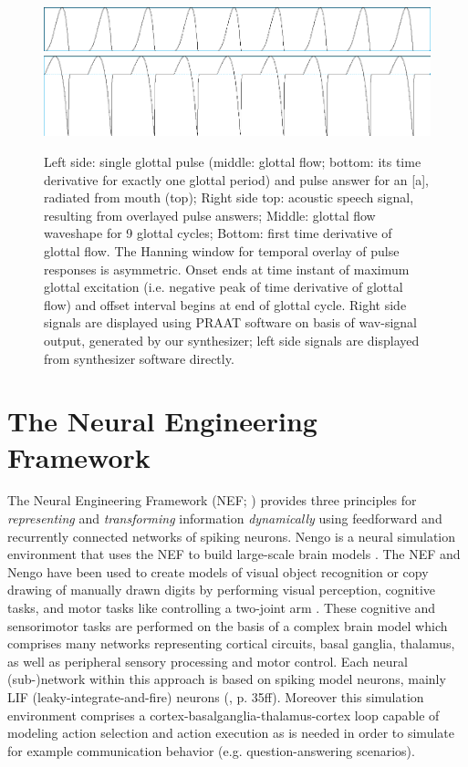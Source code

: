 \documentclass[conference]{IEEEtran}
\begin{document}
\begin{figure}[!t]
\begin{minipage}[b]{0.8\columnwidth}
    \includegraphics[width=\textwidth]{signal3}\\
    \includegraphics[width=\textwidth]{signal4}
  \end{minipage}
  \caption{Left side: single glottal pulse (middle: glottal flow;
    bottom: its time derivative for exactly one glottal period) and
    pulse answer for an [a], radiated from mouth (top); Right side
    top: acoustic speech signal, resulting from overlayed pulse
    answers; Middle: glottal flow waveshape for 9 glottal cycles;
    Bottom: first time derivative of glottal flow. The Hanning window
    for temporal overlay of pulse responses is asymmetric. Onset ends
    at time instant of maximum glottal excitation (i.e. negative peak
    of time derivative of glottal flow) and offset interval begins at
    end of glottal cycle. Right side signals are displayed using PRAAT
    software on basis of wav-signal output, generated by our
    synthesizer; left side signals are displayed from synthesizer
    software directly.}
\label{fig:signal}
\end{figure}

\section{The Neural Engineering Framework}

The Neural Engineering Framework (NEF; \cite{eliasmith2003})
provides three principles for \textit{representing} and
\textit{transforming} information \textit{dynamically}
using feedforward and recurrently connected networks
of spiking neurons.
Nengo is a neural simulation environment that uses the NEF
to build large-scale brain models \cite{bekolay2014}.
The NEF and Nengo have been used to create models of visual
object recognition or copy drawing of manually drawn digits by
performing visual perception, cognitive tasks, and motor tasks
like controlling a two-joint arm \cite{eliasmith2012,eliasmith2013}.
These cognitive and sensorimotor tasks are performed on the basis of a
complex brain model which comprises many networks representing
cortical circuits, basal ganglia, thalamus, as well as peripheral
sensory processing and motor control. Each neural (sub-)network within
this approach is based on spiking model neurons, mainly LIF
(leaky-integrate-and-fire) neurons (\cite{eliasmith2013}, p. 35ff).
Moreover this simulation environment comprises a
cortex-basalganglia-thalamus-cortex loop capable of modeling action
selection and action execution as is needed in order to simulate for
example communi­cation behavior (e.g. question-answering scenarios).
\end{document}
